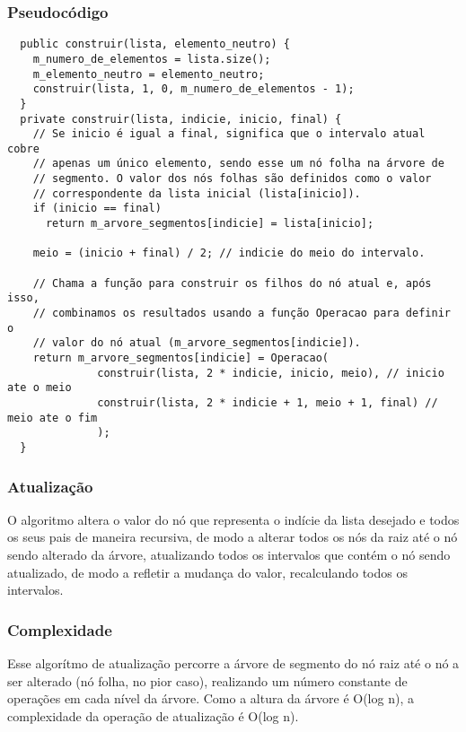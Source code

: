 \documentclass{article}
\begin{document}
\subsubsection{Pseudocódigo}
\begin{verbatim}
  public construir(lista, elemento_neutro) {
    m_numero_de_elementos = lista.size();
    m_elemento_neutro = elemento_neutro;
    construir(lista, 1, 0, m_numero_de_elementos - 1);
  }
  private construir(lista, indicie, inicio, final) {
    // Se inicio é igual a final, significa que o intervalo atual cobre
    // apenas um único elemento, sendo esse um nó folha na árvore de 
    // segmento. O valor dos nós folhas são definidos como o valor 
    // correspondente da lista inicial (lista[inicio]).
    if (inicio == final) 
      return m_arvore_segmentos[indicie] = lista[inicio];

    meio = (inicio + final) / 2; // indicie do meio do intervalo.

    // Chama a função para construir os filhos do nó atual e, após isso, 
    // combinamos os resultados usando a função Operacao para definir o 
    // valor do nó atual (m_arvore_segmentos[indicie]).
    return m_arvore_segmentos[indicie] = Operacao(
              construir(lista, 2 * indicie, inicio, meio), // inicio ate o meio
              construir(lista, 2 * indicie + 1, meio + 1, final) // meio ate o fim
              );
  }
\end{verbatim}

\subsubsection{Atualização}
O algoritmo altera o valor do nó que representa o indície da lista desejado e todos os seus pais de 
maneira recursiva, de modo a alterar todos os nós da raiz até o nó sendo alterado da árvore, atualizando
todos os intervalos que contém o nó sendo atualizado, de modo a refletir a mudança do valor, recalculando
todos os intervalos.
\subsubsection{Complexidade}
Esse algorítmo de atualização percorre a árvore de segmento do nó raiz até o nó a ser alterado (nó folha, no pior caso), realizando
um número constante de operações em cada nível da árvore. Como a altura da árvore é O(log n), a
complexidade da operação de atualização é O(log n).
\end{document}
